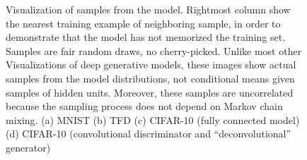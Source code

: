 \begin{figure}[htb]
	\centering
	\caption{Visualization of samples from the model. Rightmost column show the nearest training example of neighboring sample, in order to demonstrate that the model has not memorized the training set. Samples are fair random draws, no cherry-picked. Unlike most other Visualizations of deep generative models, these images show actual samples from the model distributions, not conditional means given samples of hidden units. Moreover, these samples are uncorrelated because the sampling process does not depend on Markov chain mixing. (a) MNIST (b) TFD (c) CIFAR-10 (fully connected model) (d) CIFAR-10 (convolutional discriminator and ``deconvolutional'' generator)}
	\label{fig: figure 2}
\end{figure}


